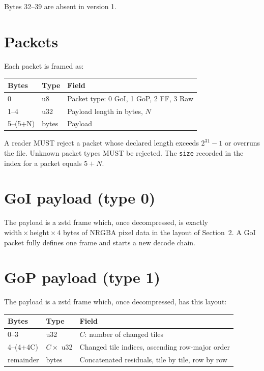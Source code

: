 \documentclass[11pt,a4paper]{article}
\begin{document}
Bytes 32--39 are absent in version 1.

\section{Packets}
\label{sec:packets}

Each packet is framed as:

\begin{center}
\begin{tabular}{@{}lll@{}}
\toprule
Bytes & Type & Field \\
\midrule
0     & u8  & Packet type: 0 GoI, 1 GoP, 2 FF, 3 Raw \\
1--4  & u32 & Payload length in bytes, $N$ \\
5--(5+N) & bytes & Payload \\
\bottomrule
\end{tabular}
\end{center}

A reader MUST reject a packet whose declared length exceeds $2^{31}-1$ or
overruns the file. Unknown packet types MUST be rejected. The \texttt{size}
recorded in the index for a packet equals $5 + N$.

\section{GoI payload (type 0)}

The payload is a zstd frame which, once decompressed, is exactly
$\text{width} \times \text{height} \times 4$ bytes of NRGBA pixel data in the
layout of Section~2. A GoI packet fully defines one frame and starts a new
decode chain.

\section{GoP payload (type 1)}

The payload is a zstd frame which, once decompressed, has this layout:

\begin{center}
\begin{tabular}{@{}lll@{}}
\toprule
Bytes & Type & Field \\
\midrule
0--3 & u32 & $C$: number of changed tiles \\
4--(4+4C) & $C \times$ u32 & Changed tile indices, ascending row-major order \\
remainder & bytes & Concatenated residuals, tile by tile, row by row \\
\bottomrule
\end{tabular}
\end{center}
\end{document}
